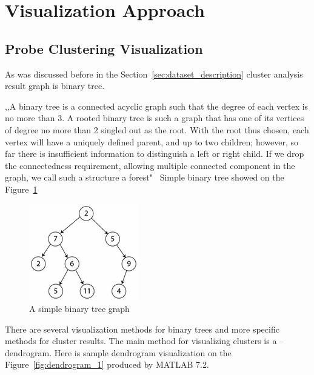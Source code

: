 \section{Visualization Approach}
\label{sec:solution}

\subsection{Probe Clustering Visualization}
\label{sec:probe}

As was discussed before in the Section~\ref{sec:dataset_description} cluster analysis result graph is binary tree.

,,A binary tree is a connected acyclic graph such that the degree of each vertex is no more than 3. A rooted binary tree is such a graph that has one of its vertices of degree no more than 2 singled out as the root. With the root thus chosen, each vertex will have a uniquely defined parent, and up to two children; however, so far there is insufficient information to distinguish a left or right child. If we drop the connectedness requirement, allowing multiple connected component in the graph, we call such a structure a forest"~\cite{BINARY_TREE} Simple binary tree showed on the Figure~\ref{fig:simple_binary_tree}

\begin{figure}[h!]
\centering
\includegraphics[scale=1.0]{pictures/simple_binary_tree.png}
\caption{A simple binary tree graph}
\label{fig:simple_binary_tree}
\end{figure}

There are several visualization methods for binary trees and more specific methods for cluster results. The main method for visualizing clusters is a -- dendrogram. Here is sample dendrogram visualization on the Figure~\ref{fig:dendrogram_1} produced by MATLAB 7.2.

